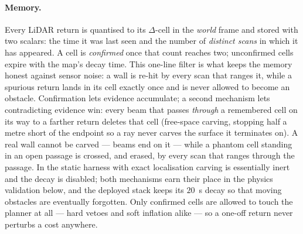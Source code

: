 \documentclass[11pt,a4paper]{article}
\begin{document}
\paragraph{Memory.} Every LiDAR return is quantised to its $\Delta$-cell in the \emph{world} frame and
stored with two scalars: the time it was last seen and the number of \emph{distinct scans} in which it has
appeared. A cell is \emph{confirmed} once that count reaches two; unconfirmed cells expire with the map's
decay time. This one-line filter is what keeps the memory honest against sensor noise: a wall is re-hit by
every scan that ranges it, while a spurious return lands in its cell exactly once and is never allowed to
become an obstacle. Confirmation lets evidence accumulate; a second mechanism lets contradicting evidence
win: every beam that passes \emph{through} a remembered cell on its way to a farther return deletes that
cell (free-space carving, stopping half a metre short of the endpoint so a ray never carves the surface it
terminates on). A real wall cannot be carved --- beams end on it --- while a phantom cell standing in an
open passage is crossed, and erased, by every scan that ranges through the passage. In the static harness
with exact localisation carving is essentially inert and the decay is disabled; both mechanisms earn their
place in the physics validation below, and the deployed stack keeps its $20$~s decay so that moving
obstacles are eventually forgotten. Only confirmed cells are allowed to touch the planner at all --- hard
vetoes and soft inflation alike --- so a one-off return never perturbs a cost anywhere.
\end{document}
